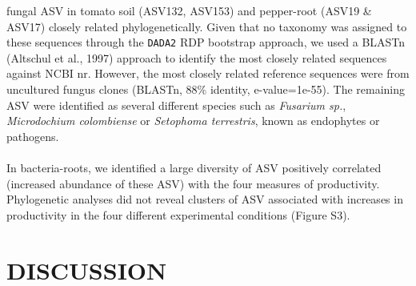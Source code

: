 \documentclass[12pt,]{article}
\begin{document}
fungal ASV in tomato soil (ASV132, ASV153) and pepper-root (ASV19 \&
ASV17) closely related phylogenetically. Given that no taxonomy was
assigned to these sequences through the \texttt{DADA2} RDP bootstrap
approach, we used a BLASTn (Altschul et al., 1997) approach to identify
the most closely related sequences against NCBI nr. However, the most
closely related reference sequences were from uncultured fungus clones
(BLASTn, 88\% identity, e-value=1e-55). The remaining ASV were
identified as several different species such as \emph{Fusarium sp.},
\emph{Microdochium colombiense} or \emph{Setophoma terrestris}, known as
endophytes or pathogens.\\
\hspace*{0.333em}\\
In bacteria-roots, we identified a large diversity of ASV positively
correlated (increased abundance of these ASV) with the four measures of
productivity. Phylogenetic analyses did not reveal clusters of ASV
associated with increases in productivity in the four different
experimental conditions (Figure S3). \newpage  

\section{DISCUSSION}\label{discussion}
\end{document}
